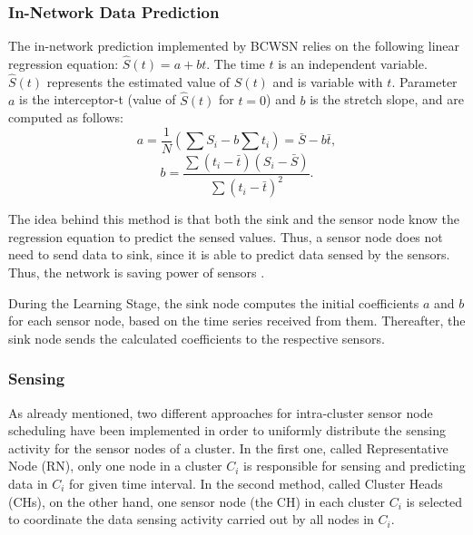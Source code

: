 \documentclass[conference]{IEEEtran}
\begin{document}
\subsubsection{In-Network Data Prediction}
\label{data-predict}


The in-network prediction implemented by BCWSN relies on the
following linear regression equation: $\hat{S}(t) = a + bt$.
The time $t$ is an independent variable. $\hat{S}(t)$ represents the estimated
value of $S(t)$ and is variable with $t$. Parameter $a$ is the interceptor-t
(value of $\hat{S}(t)$ for $t=0$) and $b$ is the stretch slope, and are computed
as follows:
\begin{equation}
	a = \frac{1}{N}\left(\sum S_{i} - b\sum t_{i} \right) = \bar{S} - b\bar{t},
\end{equation}
\vspace*{-.3cm}
\begin{equation}
	b = \frac{\sum \left(t_{i} - \bar{t}\right)\left(S_{i} - \bar{S}\right)}{\sum \left(t_{i} - \bar{t}\right)^{2}}.
\end{equation}

The idea behind this method is that both the sink and the sensor node know the
regression equation to predict the sensed values. Thus, a sensor node does not
need to send data to sink, since it is able to predict data sensed by the
sensors. Thus, the network is saving power of sensors \cite{MaiaACR2013}.

During the Learning Stage, the sink node computes the initial coefficients $a$
and $b$ for each sensor node, based on the time series received from them.
Thereafter, the sink node sends the calculated coefficients to the respective
sensors.

 
\subsubsection{Sensing}

As already mentioned, two different approaches for intra-cluster sensor node
scheduling have been implemented in order to uniformly distribute the sensing
activity for the sensor nodes of a cluster. In the first one, called
Representative Node (RN), only one node in a cluster $C_{i}$ is responsible
for sensing and predicting data in $C_{i}$ for given time interval. In the
second method, called Cluster Heads (CHs), on the other hand, one sensor node
(the CH) in each cluster $C_{i}$ is selected to coordinate the data sensing
activity carried out by all nodes in $C_{i}$.
\end{document}
